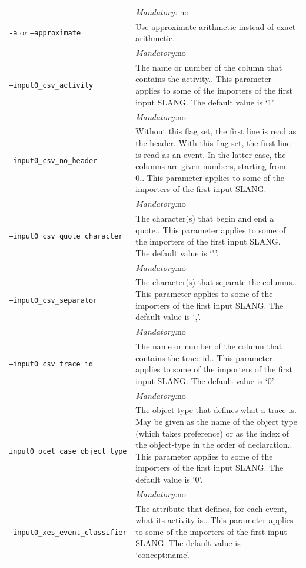 {\begin{tabularx}{\linewidth}{lX}
&\textit{Mandatory:} \quad no\\
\texttt{-a} or \texttt{--approximate} & Use approximate arithmetic instead of exact arithmetic.\\
&\textit{Mandatory:}\quad no\\
\texttt{--input0\_csv\_activity} & The name or number of the column that contains the activity.. This parameter applies to some of the importers of the first input SLANG. The default value is `1'.\\
&\textit{Mandatory:}\quad no\\
\texttt{--input0\_csv\_no\_header} & Without this flag set, the first line is read as the header. 
    With this flag set, the first line is read as an event. In the latter case, the columns are given numbers, starting from 0.. This parameter applies to some of the importers of the first input SLANG. \\
&\textit{Mandatory:}\quad no\\
\texttt{--input0\_csv\_quote\_character} & The character(s) that begin and end a quote.. This parameter applies to some of the importers of the first input SLANG. The default value is `"'.\\
&\textit{Mandatory:}\quad no\\
\texttt{--input0\_csv\_separator} & The character(s) that separate the columns.. This parameter applies to some of the importers of the first input SLANG. The default value is `,'.\\
&\textit{Mandatory:}\quad no\\
\texttt{--input0\_csv\_trace\_id} & The name or number of the column that contains the trace id.. This parameter applies to some of the importers of the first input SLANG. The default value is `0'.\\
&\textit{Mandatory:}\quad no\\
\texttt{--input0\_ocel\_case\_object\_type} & The object type that defines what a trace is. May be given as the name of the object type (which takes preference) or as the index of the object-type in the order of declaration.. This parameter applies to some of the importers of the first input SLANG. The default value is `0'.\\
&\textit{Mandatory:}\quad no\\
\texttt{--input0\_xes\_event\_classifier} & The attribute that defines, for each event, what its activity is.. This parameter applies to some of the importers of the first input SLANG. The default value is `concept:name'.\\

\end{tabularx}}
